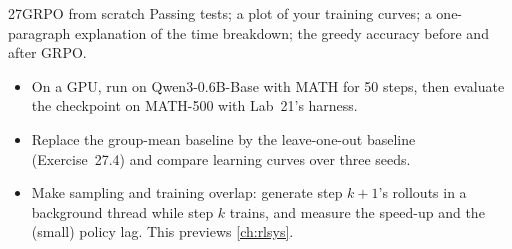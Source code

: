 \begin{labbox}{27}{GRPO from scratch}
Passing tests; a plot of your training curves; a one-paragraph explanation of the
time breakdown; the greedy accuracy before and after GRPO.

\begin{itemize}
\item On a GPU, run  on Qwen3-0.6B-Base with MATH for 50 steps, then
evaluate the checkpoint on MATH-500 with Lab~21's harness.
\item Replace the group-mean baseline by the leave-one-out baseline (Exercise~27.4) and
compare learning curves over three seeds.
\item Make sampling and training overlap: generate step $k{+}1$'s rollouts in a background
thread while step $k$ trains, and measure the speed-up and the (small) policy lag. This
previews \cref{ch:rlsys}.
\end{itemize}
\end{labbox}
